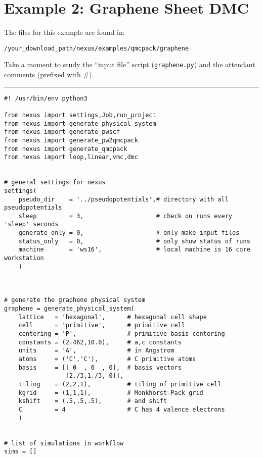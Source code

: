 \documentclass[oneside,11pt]{memoir}
\numberwithin{equation}{section}
\newcommand{\HRule}{\rule{\linewidth}{0.5mm}}
\begin{document}
\pagebreak
\section{Example 2: Graphene Sheet DMC} \label{graphene_dmc}
The files for this example are found in:
\begin{shaded}
\begin{verbatim}
/your_download_path/nexus/examples/qmcpack/graphene
\end{verbatim}
\end{shaded}

Take a moment to study the ``input file'' script 
(\texttt{graphene.py}) and the attendant comments 
(prefixed with \#). 


\HRule
\begin{verbatim}
#! /usr/bin/env python3

from nexus import settings,Job,run_project
from nexus import generate_physical_system
from nexus import generate_pwscf
from nexus import generate_pw2qmcpack
from nexus import generate_qmcpack
from nexus import loop,linear,vmc,dmc


# general settings for nexus
settings(
    pseudo_dir    = '../pseudopotentials',# directory with all pseudopotentials
    sleep         = 3,                    # check on runs every 'sleep' seconds
    generate_only = 0,                    # only make input files
    status_only   = 0,                    # only show status of runs
    machine       = 'ws16',               # local machine is 16 core workstation
    )



# generate the graphene physical system
graphene = generate_physical_system(
    lattice   = 'hexagonal',      # hexagonal cell shape
    cell      = 'primitive',      # primitive cell
    centering = 'P',              # primitive basis centering
    constants = (2.462,10.0),     # a,c constants
    units     = 'A',              # in Angstrom
    atoms     = ('C','C'),        # C primitive atoms
    basis     = [[ 0  , 0  , 0],  # basis vectors
                 [2./3,1./3, 0]],
    tiling    = (2,2,1),          # tiling of primitive cell
    kgrid     = (1,1,1),          # Monkhorst-Pack grid
    kshift    = (.5,.5,.5),       # and shift
    C         = 4                 # C has 4 valence electrons
    ) 


# list of simulations in workflow
sims = []


\end{verbatim}
\end{document}
